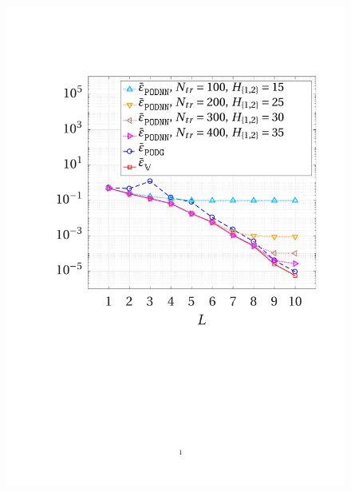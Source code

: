 \documentclass[longtitle]{elsarticle}
\numberwithin{equation}{section}
\theoremstyle{theorem}
\theoremstyle{definition}
\theoremstyle{remark}
\theoremstyle{proposition}
\numberwithin{figure}{section}
\begin{document}
		\begin{figure}[b!]
			\center
			\includegraphics[scale = 0.385, trim = {1cm 9.5cm 1cm 3.5cm}, clip]{poisson1d_error_vs_rank}

\end{figure}
\end{document}
